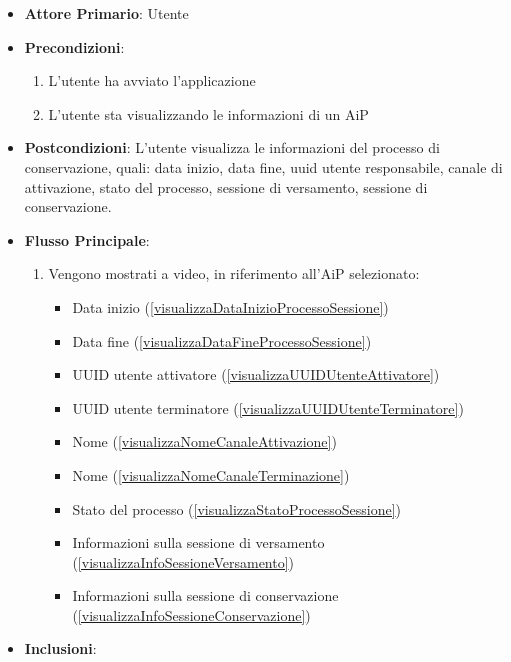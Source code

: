 \begin{itemize}
    \item \textbf{Attore Primario}: Utente
    \item \textbf{Precondizioni}:
    \begin{enumerate}
        \item L'utente ha avviato l'applicazione
        \item L'utente sta visualizzando le informazioni di un AiP
    \end{enumerate}
    \item \textbf{Postcondizioni}: L'utente visualizza le informazioni del processo di conservazione, quali: data inizio, data fine, uuid utente responsabile, canale di attivazione, stato del processo, sessione di versamento, sessione di conservazione.
    \item \textbf{Flusso Principale}:
        \begin{enumerate}
            \item Vengono mostrati a video, in riferimento all'AiP selezionato:
            \begin{itemize}
                \item Data inizio (\ref{visualizzaDataInizioProcessoSessione})
                \item Data fine (\ref{visualizzaDataFineProcessoSessione})
                \item UUID utente attivatore (\ref{visualizzaUUIDUtenteAttivatore})
                \item UUID utente terminatore (\ref{visualizzaUUIDUtenteTerminatore})
                \item Nome  (\ref{visualizzaNomeCanaleAttivazione})
                \item Nome  (\ref{visualizzaNomeCanaleTerminazione})
                \item Stato del processo (\ref{visualizzaStatoProcessoSessione})
                \item Informazioni sulla sessione di versamento (\ref{visualizzaInfoSessioneVersamento})
                \item Informazioni sulla sessione di conservazione (\ref{visualizzaInfoSessioneConservazione})
            \end{itemize}
        \end{enumerate}
    \item \textbf{Inclusioni}:
    \begin{itemize}

\end{itemize}
\end{itemize}
